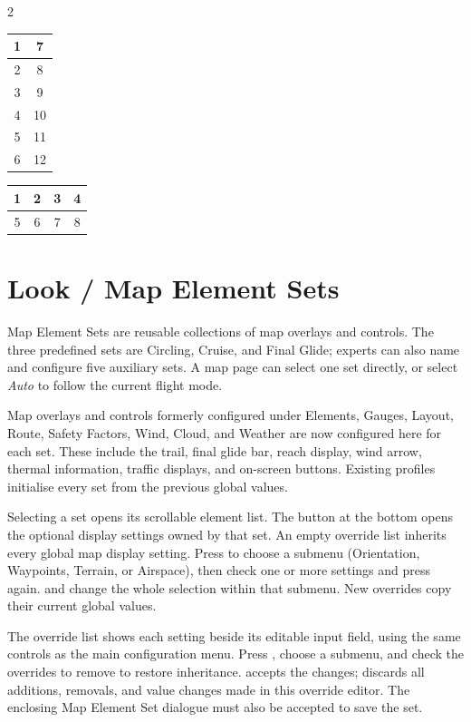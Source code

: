 \begin{multicols}{2}
\begin{tabular}{|c|c|}
\hline
1 & 7 \\
\hline
2 & 8 \\
\hline
3 & 9 \\
\hline
4 & 10 \\
\hline
5 & 11 \\
\hline
6 & 12 \\
\hline
\end{tabular}

\begin{tabular}{|c|c|c|c|}
\hline
1 & 2 & 3 & 4 \\
\hline
\hline
5 & 6 & 7 & 8 \\
\hline
\end{tabular}
\end{multicols}


\section{Look / Map Element Sets}\label{sec:map-element-sets}

Map Element Sets are reusable collections of map overlays and controls.  The
three predefined sets are Circling, Cruise, and Final Glide; experts can also
name and configure five auxiliary sets.  A map page can select one set
directly, or select \emph{Auto} to follow the current flight mode.

Map overlays and controls formerly configured under Elements, Gauges, Layout,
Route, Safety Factors, Wind, Cloud, and Weather are now configured here for
each set.  These include the trail, final glide bar, reach display, wind arrow,
thermal information, traffic displays, and on-screen buttons.  Existing
profiles initialise every set from the previous global values.

Selecting a set opens its scrollable element list.  The
 button at the bottom opens the optional display
settings owned by that set.  An empty override list inherits every global map
display setting.  Press  to choose a submenu (Orientation,
Waypoints, Terrain, or Airspace), then check one or more settings and press
 again.   and  change the whole
selection within that submenu.  New overrides copy their current global values.

The override list shows each setting beside its editable input field, using
the same controls as the main configuration menu.  Press ,
choose a submenu, and check the overrides to remove to restore inheritance.
 accepts the changes;  discards all additions,
removals, and value changes made in this override editor.  The enclosing
Map Element Set dialogue must also be accepted to save the set.

